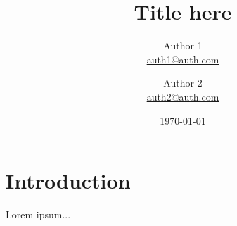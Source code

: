 \documentclass{article}
\title{Title here}
\author{
  Author 1\\
  \small{\href{mailto:auth1@auth.com}{auth1@auth.com}}
  \and
  Author 2\\
  \small{\href{mailto:auth2@auth.com}{auth2@auth.com}}
  }
\date{\today}
\begin{document}
\maketitle

\section{Introduction}

Lorem ipsum...
\end{document}
